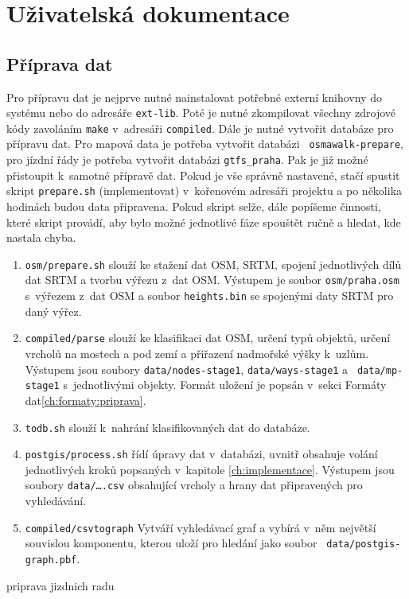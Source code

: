 \chapter{Uživatelská dokumentace}
\section{Příprava dat}
Pro přípravu dat je nejprve nutné nainstalovat potřebné externí knihovny do
systému nebo do adresáře {\tt ext-lib}. Poté je nutné zkompilovat všechny zdrojové
kódy zavoláním {\tt make} v~adresáři {\tt compiled}. Dále je nutné vytvořit databáze
pro přípravu dat. Pro mapová data je potřeba vytvořit databázi {\tt
osmawalk-prepare},
pro jízdní řády je potřeba vytvořit databázi {\tt gtfs\_praha}. Pak je již možné
přistoupit k~samotné přípravě dat. Pokud je vše správně nastavené, stačí spustit
skript {\tt prepare.sh} (\TODO implementovat) v~kořenovém adresáři projektu a po několika hodinách
budou data připravena. Pokud skript selže, dále popíšeme činnosti, které skript
provádí, aby bylo možné jednotlivé fáze spouštět ručně a hledat, kde nastala chyba.

\begin{enumerate}
\item {\tt osm/prepare.sh} slouží ke stažení dat OSM, SRTM, spojení jednotlivých
dílů dat SRTM a tvorbu výřezu z~dat OSM. Výstupem je soubor {\tt osm/praha.osm}
s~výřezem z~dat OSM a soubor {\tt heights.bin} se spojenými daty SRTM pro daný
výřez. 
\item {\tt compiled/parse} slouží ke klasifikaci dat OSM, určení typů objektů,
určení vrcholů na mostech a pod zemí a přiřazení nadmořské výšky k~uzlům.
Výstupem jsou soubory {\tt data/nodes-stage1}, {\tt data/ways-stage1} a {\tt
data/mp-stage1} s~jednotlivými objekty. Formát uložení je popsán v~sekci Formáty
dat\ref{ch:formaty:priprava}.
\item {\tt todb.sh} slouží k~nahrání klasifikovaných dat do databáze. 
\item {\tt postgis/process.sh} řídí úpravy dat v~databázi, uvnitř obsahuje
volání jednotlivých kroků popsaných v~kapitole \ref{ch:implementace}.
Výstupem jsou soubory {\tt data/\dots.csv} obsahující vrcholy a hrany dat
připravených pro vyhledávání. 
\item {\tt compiled/csvtograph} Vytváří vyhledávací graf a vybírá v~něm největší
souvislou komponentu, kterou uloží pro hledání jako soubor {\tt
data/postgis-graph.pbf}.
\end{enumerate}
\TODO priprava jizdnich radu

